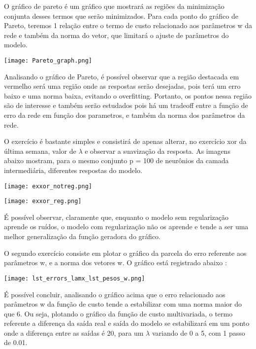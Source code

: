 \documentclass{article}
\begin{document}
\vspace{20pt}

O gráfico de pareto é um gráfico que mostrará as regiões da minimização conjunta desses termos que serão minimizados. Para cada ponto do gráfico de Pareto, teremos 1 relação entre o termo de custo relacionado aos parâmetros w da rede e também da norma do vetor, que limitará o ajuste de parâmetros do modelo.
\begin{center}

\texttt{[image: Pareto\_graph.png]}

\end{center}

\vspace{20pt}

Analisando o gráfico de Pareto, é possível observar que a região destacada em vermelho será uma região onde as respostas serão desejadas, pois terá um erro baixo e uma norma baixa, evitando o overfitting. Portanto, os pontos nessa região são de interesse e também serão estudados pois há um tradeoff entre a função de erro da rede em função dos parametros, e também da norma dos parâmetros da rede.

\vspace{60pt}
O exercício é bastante simples e consistirá de apenas alterar, no exercício xor da última semana, valor de $\lambda$ e observar a suavização da resposta. As imagens abaixo mostram, para o mesmo conjunto p = 100 de neurônios da camada intermediária, diferentes respostas do modelo.
\vspace{20pt}
\begin{center}

\texttt{[image: exxor\_notreg.png]}

\end{center}
\vspace{20pt}
\begin{center}

\texttt{[image: exxor\_reg.png]}

\end{center}
\vspace{20pt}

É possível observar, claramente que, enquanto o modelo sem regularização aprende os ruídos, o modelo com regularização não os aprende e tende a ser uma melhor generalização da função geradora do gráfico.
\vspace{20pt}

O segundo exercício consiste em plotar o gráfico da parcela do erro referente aos parâmetros w, e a norma dos vetores w. O gráfico está registrado abaixo : 
\begin{center}

\texttt{[image: lst\_errors\_lamx\_lst\_pesos\_w.png]}

\end{center}
É possível concluir, analisando o gráfico acima que o erro relacionado aos parâmetros w da função de custo tende a estabilizar com uma norma maior do que 6. Ou seja, plotando o gráfico da função de custo multivariada, o termo referente a diferença da saída real e saída do modelo se estabilizará em um ponto onde a diferença entre as saídas é 20, para um $\lambda$ variando de 0 a 5, com 1 passo de 0.01.
\end{document}
